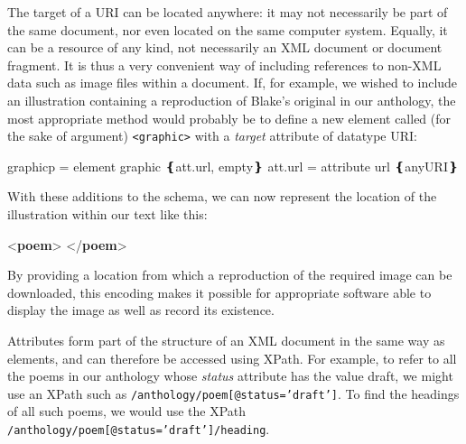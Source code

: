 The target of a URI can be located anywhere: it may not necessarily be part of the same document, nor even located on the same computer system. Equally, it can be a resource of any kind, not necessarily an XML document or document fragment. It is thus a very convenient way of including references to non-XML data such as image files within a document. If, for example, we wished to include an illustration containing a reproduction of Blake's original in our anthology, the most appropriate method would probably be to define a new element called (for the sake of argument) \texttt{<graphic>} with a {\itshape target} attribute of datatype URI: \par\hfill\bgroup\exampleFont\vskip 10pt\begin{shaded}
\obeyspaces graphic\textunderscore p = element graphic ❴att.url, empty❵ att.url =\newline
attribute url ❴anyURI❵\end{shaded}
\par\egroup 
 With these additions to the schema, we can now represent the location of the illustration within our text like this: \par\bgroup\exampleFont \begin{shaded}\noindent\mbox{}{<\textbf{poem}>}\mbox{}\newline 
{}\mbox{}\newline 
{</\textbf{poem}>}\end{shaded}\egroup\par \noindent  By providing a location from which a reproduction of the required image can be downloaded, this encoding makes it possible for appropriate software able to display the image as well as record its existence.\par
Attributes form part of the structure of an XML document in the same way as elements, and can therefore be accessed using XPath. For example, to refer to all the poems in our anthology whose {\itshape status} attribute has the value draft, we might use an XPath such as \texttt{/anthology/poem[@status='draft']}. To find the headings of all such poems, we would use the XPath \texttt{/anthology/poem[@status='draft']/heading}.
